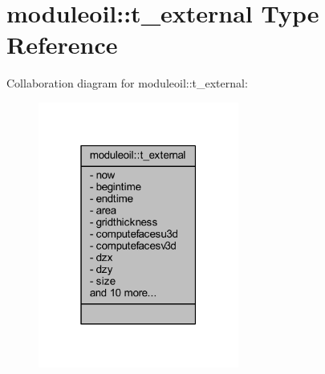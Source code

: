 \hypertarget{structmoduleoil_1_1t__external}{}\section{moduleoil\+:\+:t\+\_\+external Type Reference}
\label{structmoduleoil_1_1t__external}


Collaboration diagram for moduleoil\+:\+:t\+\_\+external\+:\nopagebreak
\begin{figure}[H]
\begin{center}
\leavevmode
\includegraphics[width=187pt]{structmoduleoil_1_1t__external__coll__graph}
\end{center}
\end{figure}
